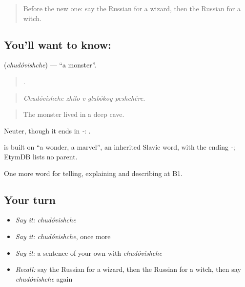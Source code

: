 \label{lesson:RU-C320-chudovishche}



\begin{quote}
Before the new one: say the Russian for a wizard, then the Russian for a witch.
\end{quote}

\subsection*{You'll want to know: }
\textbf{} (\emph{chudóvishche}) — \textquotedblleft{}a monster\textquotedblright{}.

\begin{quote}
    .
\end{quote}

\begin{quote}
\emph{Chudóvishche zhílo v glubókoy peshchére.}
\end{quote}

\begin{quote}
The monster lived in a deep cave.
\end{quote}

Neuter, though it ends in \emph{-}: \emph{ }.

\begin{cousinweb}
\emph{} is built on \emph{} \textquotedblleft{}a wonder, a marvel\textquotedblright{}, an inherited Slavic word, with the ending \emph{-}; EtymDB lists no parent.
\end{cousinweb}

\begin{grammarlens}[title={What you've built}]
One more word for telling, explaining and describing at B1.
\end{grammarlens}

\subsection*{Your turn}
\begin{itemize}
\raggedright
  \item \emph{Say it:} \emph{chudóvishche}
  \item \emph{Say it:} \emph{chudóvishche}, once more
  \item \emph{Say it:} a sentence of your own with \emph{chudóvishche}
  \item \emph{Recall:} say the Russian for a wizard, then the Russian for a witch, then say \emph{chudóvishche} again
\end{itemize}

